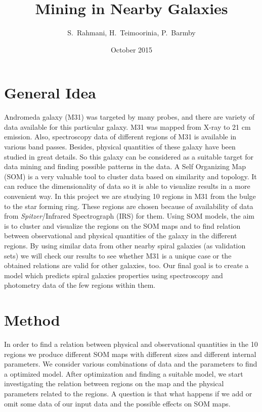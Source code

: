 \documentclass{article}
\title{Mining in Nearby Galaxies}
\author{S.~Rahmani, H.~Teimoorinia, P.~Barmby}
\date{October 2015}
\newcommand \Spitzer {{\it Spitzer}}
\begin{document}
\maketitle

\section*{General Idea}

Andromeda galaxy (M31) was targeted by many probes, and there are variety of data available for this particular galaxy.
M31 was mapped from X-ray to 21 cm emission. Also, spectroscopy data of different regions of M31 is available in various band passes. Besides, physical quantities of these galaxy have been studied in great details. 
 So this galaxy can be considered as a suitable target for data mining and finding possible patterns in the data.
 A Self Organizing Map (SOM) is a very valuable tool to cluster data based on similarity and topology. It can reduce the dimensionality of data so it is able to visualize results in a more convenient way.
In this project we are studying 10 regions in M31 from the bulge to the star forming ring. These regions are chosen because of availability of data from \Spitzer/Infrared Spectrograph (IRS) for them.
Using SOM models, the aim is to cluster and visualize the regions on the SOM maps and to find relation between observational and physical quantities of the galaxy in the different regions. 
By using similar data from other nearby spiral galaxies (as validation sets) we will check our results to see whether M31 is a unique case or the obtained relations are valid for other galaxies, too. 
Our final goal is to create a model which predicts spiral galaxies properties using spectroscopy and photometry data of the few regions within them.

\section*{Method}

In order to find a relation between physical and observational quantities in the 10 regions we produce different SOM maps with different sizes and different internal parameters. 
We consider various combinations of data and the parameters to find a optimized model. After optimization and finding a suitable model, we start investigating the relation between regions on the map and the physical parameters related to the regions. A question is that what happens if we add or omit some data of our input data and the possible effects on SOM maps.
\end{document}

